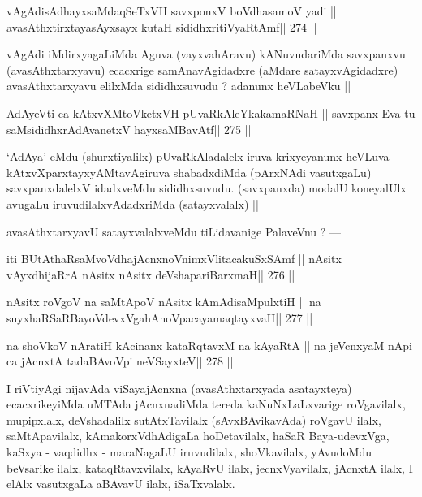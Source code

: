 \begin{shl}
vAgAdisAdhayxsaMdaqSeTxVH \footnotemark[1]savxponxV \footnotemark[2]boVdhasamoV yadi ||
avasAthxtirxtayasAyxsayx kutaH sididhxritiVyaRtAmf\hfill || 274 ||
\end{shl}

\begin{artha}
vAgAdi iMdirxyagaLiMda Aguva (vayxvahAravu) kANuvudariMda savxpanxvu (avasAthxtarxyavu) ecacxrige samAnavAgidadxre (aMdare satayxvAgidadxre) avasAthxtarxyavu elilxMda sididhxsuvudu ? adanunx heVLabeVku ||
\end{artha}

\begin{shl}
AdAyeVti ca kAtxvXMtoVketxVH pUvaRkAleYkakamaRNaH ||
savxpanx Eva tu saMsididhxrAdAvanetxV hayxsaMBavAtf\hfill || 275 ||
\end{shl}

\begin{artha}
`AdAya' eMdu (shurxtiyalilx) pUvaRkAladalelx iruva krixyeyanunx heVLuva kAtxvXparxtayxyAMtavAgiruva shabadxdiMda (pArxNAdi vasutxgaLu) savxpanxdalelxV idadxveMdu sididhxsuvudu. (savxpanxda) modalU koneyalUlx avugaLu iruvudilalxvAdadxriMda (satayxvalalx) ||
\end{artha}

\begin{artha}
avasAthxtarxyavU satayxvalalxveMdu tiLidavanige PalaveVnu ? ---
\end{artha}

\begin{shl}
iti BUtAthaRsaMvoVdhajAcnxnoVnimxVlitacakuSxSAmf ||
nAsitx vAyxdhijaRrA nAsitx nAsitx deVshapariBarxmaH\hfill || 276 ||
\end{shl}

\begin{shl}
nAsitx roVgoV na saMtApoV nAsitx kAmAdisaMpulxtiH ||
na suyxhaRSaRBayoVdevxVgahAnoVpacayamaqtayxvaH\hfill || 277 ||
\end{shl}

\begin{shl}
na shoVkoV nAratiH kAcinanx kataRqtavxM na kAyaRtA ||
na jeVcnxyaM nApi ca jAcnxtA tadaBAvoV\s pi neVSayxteV\hfill || 278 ||
\end{shl}

\begin{artha}
I riVtiyAgi nijavAda viSayajAcnxna (avasAthxtarxyada asatayxteya) ecacxrikeyiMda uMTAda jAcnxnadiMda tereda kaNuNxLaLxvarige roVgavilalx, mupipxlalx, deVshadalilx sutAtxTavilalx (sAvxBAvikavAda) roVgavU ilalx, saMtApavilalx, kAmakorxVdhAdigaLa hoDetavilalx, haSaR Baya-udevxVga, kaSxya - vaqdidhx - maraNagaLU iruvudilalx, shoVkavilalx, yAvudoMdu beVsarike ilalx, kataqRtavxvilalx, kAyaRvU ilalx, jecnxVyavilalx, jAcnxtA ilalx, I elAlx vasutxgaLa aBAvavU ilalx, iSaTxvalalx.
\end{artha}

